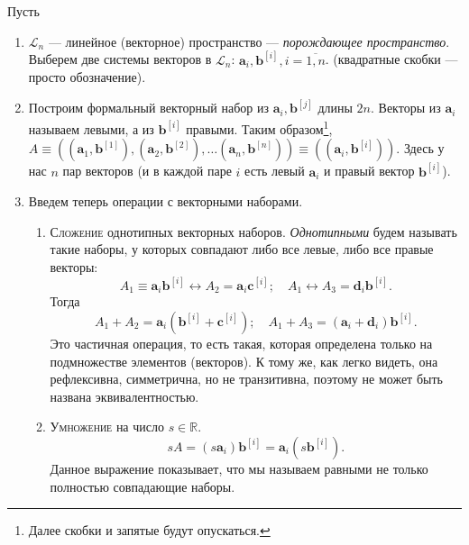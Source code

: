 \renewcommand{\thedefinition}{\ref{tensor-def}$''$}
\addtocounter{definition}{-1}
\begin{definition}[геометрическое]
Пусть

  \begin{enumerate}
    \item $\mathcal{L}_n$ --- линейное (векторное) пространство --- \emph{порождающее пространство}.
      Выберем две системы векторов в $\mathcal{L}_n$: $\mathbf{a}_i, \mathbf{b}^{[i]}, i = \overline{1, n}$.
      (квадратные скобки --- просто обозначение).

    \item Построим формальный векторный набор из $\mathbf{a}_i,
      \mathbf{b}^{[j]}$ длины $2n$.
      Векторы из $\mathbf{a}_i$ называем левыми, а из $\mathbf{b}^{[i]}$
      правыми. Таким образом\footnote{Далее скобки и запятые будут опускаться.}, 
      $A \equiv ((\mathbf{a}_1, \mathbf{b}^{[1]}), (\mathbf{a}_2,
      \mathbf{b}^{[2]}), \dots (\mathbf{a}_n, \mathbf{b}^{[n]}))
      \equiv ((\mathbf{a}_i, \mathbf{b}^{[i]}))$.
      Здесь у нас $ n $ пар векторов (и в каждой паре $ i $ есть левый $\mathbf{a}_i$ и правый вектор
      $\mathbf{b}^{[i]}$).

    \item Введем теперь операции с векторными наборами.
      \begin{enumerate}
        \item \textsc{Сложение} однотипных векторных наборов. \emph{Однотипными} будем называть такие наборы, у 
          которых совпадают либо все левые, либо все правые векторы:
          \[
            A_1 \equiv \mathbf{a}_i \mathbf{b}^{[i]} \leftrightarrow A_2 = \mathbf{a}_i \mathbf{c}^{[i]}; 
            \quad
            A_1 \leftrightarrow A_3 = \mathbf{d}_i \mathbf{b}^{[i]}.
          \]
          Тогда
          \[
            A_1+A_2 = \mathbf{a}_i (\mathbf{b}^{[i]} + \mathbf{c}^{[i]}); \quad
            A_1+A_3 = (\mathbf{a}_i + \mathbf{d}_i) \mathbf{b}^{[i]}.
          \]
          Это частичная операция, то есть такая, которая определена только на
          подмножестве элементов (векторов). К тому же, как легко видеть, она рефлексивна,
          симметрична, но не транзитивна, поэтому не может быть названа
          эквивалентностью.

        \item \textsc{Умножение} на число $s \in \mathbb{R}$.
          \[
            sA = (s \mathbf{a}_i) \mathbf{b}^{[i]} = \mathbf{a}_i (s \mathbf{b}^{[i]}).
          \]
          Данное выражение показывает, что мы называем равными не только
          полностью совпадающие наборы.
        

\end{enumerate}
\end{enumerate}
\end{definition}
